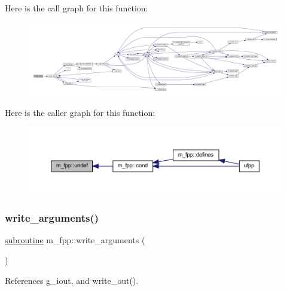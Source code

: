 Here is the call graph for this function\+:
\nopagebreak
\begin{figure}[H]
\begin{center}
\leavevmode
\includegraphics[width=350pt]{namespacem__fpp_aa3c22b47ddfcf47940f8254d4a44c448_cgraph}
\end{center}
\end{figure}
Here is the caller graph for this function\+:
\nopagebreak
\begin{figure}[H]
\begin{center}
\leavevmode
\includegraphics[width=350pt]{namespacem__fpp_aa3c22b47ddfcf47940f8254d4a44c448_icgraph}
\end{center}
\end{figure}
\mbox{\label{namespacem__fpp_a2b24b85d02a85630ee16ee81d5277c28}} 
\subsubsection{\texorpdfstring{write\+\_\+arguments()}{write\_arguments()}}
{\footnotesize\ttfamily \hyperlink{M__stopwatch_83_8txt_acfbcff50169d691ff02d4a123ed70482}{subroutine} m\+\_\+fpp\+::write\+\_\+arguments (\begin{DoxyParamCaption}{ }\end{DoxyParamCaption})}



References g\+\_\+iout, and write\+\_\+out().

